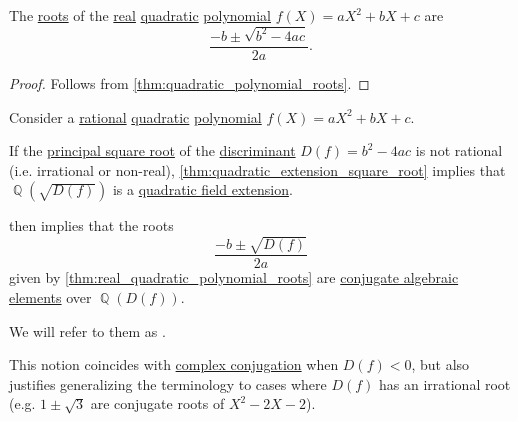 \begin{proposition}\label{thm:real_quadratic_polynomial_roots}
  The \hyperref[def:root_of_polynomial]{roots} of the \hyperref[def:real_numbers]{real} \hyperref[def:polynomial_degree_terminology]{quadratic} \hyperref[def:polynomial_algebra]{polynomial} \( f(X) = a X^2 + b X + c \) are
  \begin{equation}\label{eq:def:conjugate_quadratic_roots}
    \frac {-b \pm \sqrt{b^2 - 4ac}} {2a}.
  \end{equation}
\end{proposition}
\begin{proof}
  Follows from \cref{thm:quadratic_polynomial_roots}.
\end{proof}

\begin{remark}\label{rem:conjugate_quadratic_roots}\mimprovised
  Consider a \hyperref[def:rational_numbers]{rational} \hyperref[def:polynomial_degree_terminology]{quadratic} \hyperref[def:polynomial_algebra]{polynomial} \( f(X) = a X^2 + b X + c \).

  If the \hyperref[def:principal_real_square_root]{principal square root} of the \hyperref[def:discriminant]{discriminant} \( D(f) = b^2 - 4ac \) is not rational (i.e. irrational or non-real), \cref{thm:quadratic_extension_square_root} implies that \( \BbbQ(\sqrt{D(f)}) \) is a \hyperref[def:field_extension_degree]{quadratic field extension}.

   then implies that the roots
  \begin{equation*}
    \frac {-b \pm \sqrt{D(f)}} {2a}
  \end{equation*}
  given by \cref{thm:real_quadratic_polynomial_roots} are \hyperref[def:conjugate_algebraic_element]{conjugate algebraic elements} over \( \BbbQ(D(f)) \).

  We will refer to them as .
\end{remark}
\begin{comments}
  \item This notion coincides with \hyperref[def:complex_conjugation]{complex conjugation} when \( D(f) < 0 \), but also justifies generalizing the terminology to cases where \( D(f) \) has an irrational root (e.g. \( 1 \pm \sqrt 3 \) are conjugate roots of \( X^2 - 2X - 2 \)).
\end{comments}

